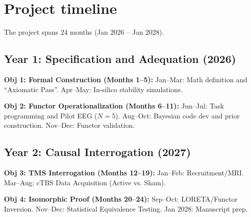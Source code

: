 \documentclass{article}
\begin{document}
	\section{Project timeline}
	The project spans 24 months (Jan 2026 -- Jan 2028).
	
	\subsection*{Year 1: Specification and Adequation (2026)}
	\textbf{Obj 1: Formal Construction (Months 1--5):} Jan--Mar: Math definition and ``Axiomatic Pass''. Apr--May: In-silico stability simulations.
	
	\noindent \textbf{Obj 2: Functor Operationalization (Months 6--11):} Jun--Jul: Task programming and Pilot EEG ($N=5$). Aug--Oct: Bayesian code dev and prior construction. Nov--Dec: Functor validation.
	
	\subsection*{Year 2: Causal Interrogation (2027)}
	\textbf{Obj 3: TMS Interrogation (Months 12--19):} Jan--Feb: Recruitment/MRI. Mar--Aug: cTBS Data Acquisition (Active vs. Sham).
	
	\noindent \textbf{Obj 4: Isomorphic Proof (Months 20--24):} Sep--Oct: LORETA/Functor Inversion. Nov--Dec: Statistical Equivalence Testing. Jan 2028: Manuscript prep.
	
	\newpage
	
	\printbibliography
	
\end{document}
